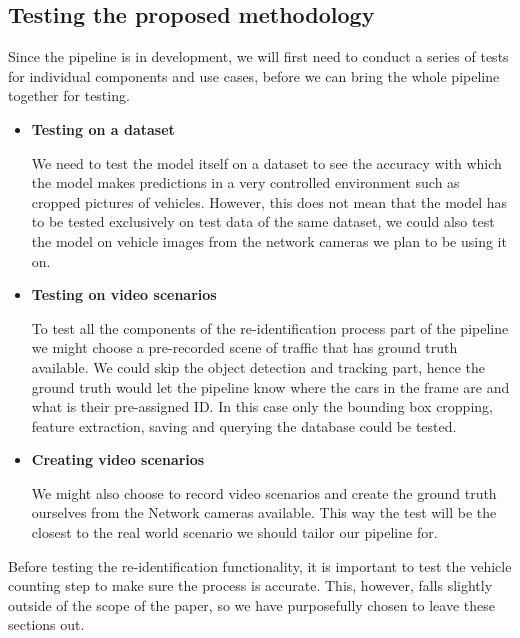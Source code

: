 \documentclass[conference]{IEEEtran} %
\begin{document}
				
	\subsection{Testing the proposed methodology}
		Since the pipeline is in development, we will first need to conduct a series of tests for individual components and use cases, before we can bring the whole pipeline together for testing.
		
	\begin{itemize}
		\item \textbf{Testing on a dataset}
		
		We need to test the model itself on a dataset to see the accuracy with which the model makes predictions in a very controlled environment such as cropped pictures of vehicles. However, this does not mean that the model has to be tested exclusively on test data of the same dataset, we could also test the model on vehicle images from the network cameras we plan to be using it on.
		
		\item \textbf{Testing on video scenarios}
		
		To test all the components of the re-identification process part of the pipeline we might choose a pre-recorded scene of traffic that has ground truth available. We could skip the object detection and tracking part, hence the ground truth would let the pipeline know where the cars in the frame are and what is their pre-assigned ID. In this case only the bounding box cropping, feature extraction, saving and querying the database could be tested.
		
		\item \textbf{Creating video scenarios}
		
		We might also choose to record video scenarios and create the ground truth ourselves from the Network cameras available. This way the test will be the closest to the real world scenario we should tailor our pipeline for.\newline
		
	\end{itemize}
	
	Before testing the re-identification functionality, it is important to test the vehicle counting step to make sure the process is accurate. This, however, falls slightly outside of the scope of the paper, so we have purposefully chosen to leave these sections out.
	
\end{document}
